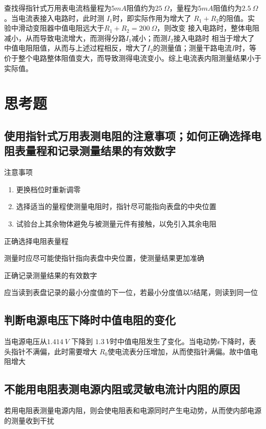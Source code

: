 \documentclass[UTF8]{ctexart}
\begin{document}
查找得指针式万用表电流档量程为$5mA$阻值约为$25 \ \Omega$，量程为$5mA$阻值约为$2.5 \ \Omega$。当电流表接入电路时，此时测 $I_1$时，即实际作用为增大了 $R_1 + R_2$的阻值。实验中滑动变阻器中值电阻远大于$R_1 + R_2 = 200 \ \Omega$，则改变 接入电路时，整体电阻减小，从而导致电流增大，而测得分路$I_1$减小；而测$I_2$接入电路时 相当于增大了 中值电阻阻值，从而与上述过程相反，增大了$I_2$的测量值；测量干路电流$I$时，等价于整个电路整体阻值变大，而导致测得电流变小。综上电流表内阻测量结果小于实际值。






















\section{思考题}

\subsection{使用指针式万用表测电阻的注意事项；如何正确选择电阻表量程和记录测量结果的有效数字}
注意事项
\begin{enumerate}
    \item 更换档位时重新调零
    \item 选择适当的量程使测量电阻时，指针尽可能指向表盘的中央位置
    \item 试验台上其余物体避免与被测量元件有接触，以免引入其余电阻
\end{enumerate}
正确选择电阻表量程

测量时应尽可能使指针指向表盘中央位置，使测量结果更加准确

正确记录测量结果的有效数字

应当读到表盘记录的最小分度值的下一位，若最小分度值以5结尾，则读到同一位


\subsection{判断电源电压下降时中值电阻的变化}
当电源电压从$1.414\ V$ 下降到 $1.3 \ V$时中值电阻发生了变化。当电动势$\epsilon$下降时，表头指针不满偏，此时需要增大 $R_0$使电流表分压增加，从而使指针满偏。故中值电阻增大

\subsection{不能用电阻表测电源内阻或灵敏电流计内阻的原因}
若用电阻表测量电源内阻，则会使电阻表和电源同时产生电动势，从而使内部电源的测量收到干扰
\end{document}
